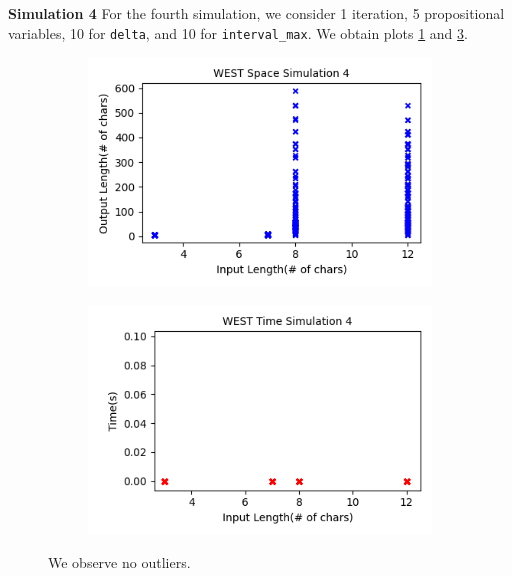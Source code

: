 \documentclass[runningheads]{llncs}
\begin{document}
\noindent\textbf{Simulation 4}
For the fourth simulation, we consider 1 iteration, 5 propositional variables, 10 for \texttt{delta}, and 10 for \texttt{interval\_max}. We obtain plots \ref{InLenVsOutLen4} and \ref{InLenVsRunTime4}.
\begin{figure}[h]
\captionsetup[subfigure]{aboveskip=-1pt,belowskip=-1pt}
    \centering
    \begin{subfigure}[h]{0.49\textwidth}
    \centering
    \includegraphics[width=\textwidth]{images/WESTspace4.png}
    \caption{}
    \label{InLenVsOutLen4}
    \end{subfigure}
    \begin{subfigure}[h]{0.49\textwidth}
    \centering
    \includegraphics[width=\textwidth]{images/WESTtime4.png}
    \caption{}
    \label{InLenVsRunTime4}
    \end{subfigure}
    \caption{We observe no outliers.}
\end{figure}
\end{document}
